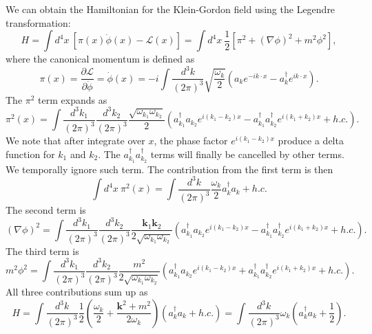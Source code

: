\documentclass[aps,prb,superscriptaddress,nofootinbib]{revtex4}
\begin{document}
We can obtain the Hamiltonian for the Klein-Gordon field using the Legendre transformation:
\begin{equation}
	H = \int d^4 x\ \left[\pi(x) \dot{\phi}(x) - \mathcal L(x) \right] 
	= \int d^4 x\ \frac{1}{2} \left[\pi^2 + (\nabla \phi)^2 + m^2 \phi^2 \right],
\end{equation}
where the canonical momentum is defined as
\begin{equation}
	\pi(x) = \frac{\partial \mathcal L}{\partial \dot{\phi}} = \dot{\phi}(x) 
	= -i\int \frac{d^{3} k}{(2\pi)^{3}} \sqrt{\frac{\omega_{k}}{2}}\left(a_k 
		e^{-i k \cdot x} - a_k^{\dagger} e^{i k \cdot x}\right).
\end{equation}
The $\pi^2$ term expands as
\begin{equation}
	\pi^2(x) = \int \frac{d^{3} k_1}{(2\pi)^{3}} \frac{d^{3} k_2}{(2\pi)^{3}}
		\frac{\sqrt{\omega_{k_1} \omega_{k_2}}}{2} \left(a^\dagger_{k_1}a_{k_2}e^{i(k_1-k_2)x} - a^\dagger_{k_1} a^\dagger_{k_2} e^{i(k_1+k_2)x} + h.c.\right).
\end{equation}
We note that after integrate over $x$, the phase factor $e^{i(k_1-k_2)x}$ produce a delta function for $k_1$ and $k_2$.
The $a^\dagger_{k_1} a^\dagger_{k_2}$ terms will finally be cancelled by other terms.
We temporally ignore such term.
The contribution from the first term is then
\begin{equation}
	\int d^4 x\ \pi^2(x) = \int \frac{d^3 k}{(2\pi)^3} \frac{\omega_k}{2} a_k^\dagger a_k + h.c.
\end{equation}
The second term is
\begin{equation}
	(\nabla \phi)^2 = \int \frac{d^{3} k_1}{(2\pi)^{3}} \frac{d^{3} k_2}{(2\pi)^{3}}
		\frac{\bm k_1 \bm k_2}{2\sqrt{\omega_{k_1}\omega_{k_2}}} \left(a^\dagger_{k_1}a_{k_2}e^{i(k_1-k_2)x} - a^\dagger_{k_1} a^\dagger_{k_2} e^{i(k_1+k_2)x} + h.c.\right).
\end{equation}
The third term is
\begin{equation}
	m^2 \phi^2 = \int \frac{d^{3} k_1}{(2\pi)^{3}} \frac{d^{3} k_2}{(2\pi)^{3}}
		\frac{m^2}{2\sqrt{\omega_{k_1}\omega_{k_2}}} \left(a^\dagger_{k_1}a_{k_2}e^{i(k_1-k_2)x} + a^\dagger_{k_1} a^\dagger_{k_2} e^{i(k_1+k_2)x} + h.c.\right).
\end{equation}
All three contributions sum up as
\begin{equation}
	H = \int \frac{d^3 k}{(2\pi)^3} \frac{1}{2}\left(\frac{\omega_k}{2} + \frac{\bm k^2+m^2}{2 \omega_k}\right) \left(a_k^\dagger a_k + h.c. \right) 
	= \int \frac{d^3 k}{(2\pi)^3} \omega_k \left(a_k^\dagger a_k +\frac{1}{2} \right).
\end{equation}
\end{document}
